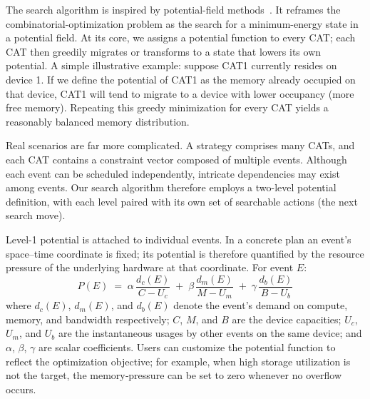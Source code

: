 \documentclass[letterpaper,twocolumn,10pt]{article}
\begin{document}
The search algorithm is inspired by potential-field methods~\cite{koren1991potential}. It reframes the combinatorial-optimization problem as the search for a minimum-energy state in a potential field. At its core, we assigns a potential function to every CAT; each CAT then greedily migrates or transforms to a state that lowers its own potential. A simple illustrative example: suppose CAT1 currently resides on device 1. If we define the potential of CAT1 as the memory already occupied on that device, CAT1 will tend to migrate to a device with lower occupancy (more free memory). Repeating this greedy minimization for every CAT yields a reasonably balanced memory distribution.

Real scenarios are far more complicated. A strategy comprises many CATs, and each CAT contains a constraint vector composed of multiple events. Although each event can be scheduled independently, intricate dependencies may exist among events. Our search algorithm therefore employs a two-level potential definition, with each level paired with its own set of searchable actions (the next search move).

Level-1 potential is attached to individual events. In a concrete plan an event’s space–time coordinate is fixed; its potential is therefore quantified by the resource pressure of the underlying hardware at that coordinate. For event $E$:
\begin{equation}\label{eq:event_potential}
P(E) \;=\; \alpha\,\frac{d_c(E)}{C - U_c} \;+\; \beta\,\frac{d_m(E)}{M - U_m} \;+\; \gamma\,\frac{d_b(E)}{B - U_b}
\end{equation}
where $d_c(E)$, $d_m(E)$, and $d_b(E)$ denote the event’s demand on compute, memory, and bandwidth respectively; $C$, $M$, and $B$ are the device capacities; $U_c$, $U_m$, and $U_b$ are the instantaneous usages by other events on the same device; and $\alpha$, $\beta$, $\gamma$ are scalar coefficients. Users can customize the potential function to reflect the optimization objective; for example, when high storage utilization is not the target, the memory‑pressure can be set to zero whenever no overflow occurs.
\end{document}
